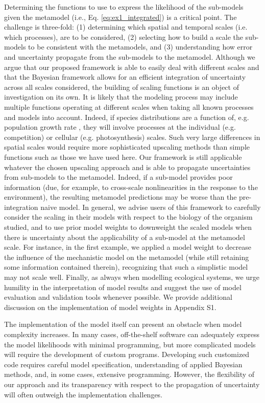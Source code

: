 \documentclass[11pt]{article}
\newcommand{\rev}[1]{{\color{RoyalBlue}#1}}
\begin{document}
Determining the functions to use to express the likelihood of the sub-models given the metamodel (i.e., Eq. \ref{eq:ex1_integrated}) is a critical point.
The challenge is three-fold: (1) determining which spatial and temporal scales (i.e. which processes), are to be considered, (2) selecting how to build a scale the sub-models to be consistent with the metamodels, and (3) understanding how error and uncertainty propagate from the sub-models to the metamodel. 
Although we argue that our proposed framework is able to easily deal with different scales and that the Bayesian framework allows for an efficient integration of uncertainty across all scales considered, the building of scaling functions is an object of investigation on its own. 
It is likely that the modeling process may include multiple functions operating at different scales when taking all known processes and models into account. 
Indeed, if species distributions are a function of, e.g. population growth rate \citep{Guisan2000}, they will involve processes at the individual (e.g. competition) or cellular (e.g. photosynthesis) scales. 
Such very large differences in spatial scales would require more sophisticated upscaling methods than simple functions such as those we have used here. 
Our framework is still applicable whatever the chosen upscaling approach and is able to propagate uncertainties from sub-models to the metamodel.
\rev{Indeed, if a sub-model provides poor information (due, for example, to cross-scale nonlinearities in the response to the environment), the resulting metamodel predictions may be worse than the pre-integration naive model.
In general, we advise users of this framework to carefully consider the scaling in their models with respect to the biology of the organism studied, and to use prior model weights to downweight the scaled models when there is uncertainty about the applicability of a sub-model at the metamodel scale.
For instance, in the first example, we applied a model weight to decrease the influence of the mechanistic model on the metamodel (while still retaining some information contained therein), recognizing that such a simplistic model may not scale well.
Finally, as always when modelling ecological systems, we urge humility in the interpretation of model results and suggest the use of model evaluation and validation tools whenever possible.
We provide additional discussion on the implementation of model weights in Appendix S1.}

The implementation of the model itself can present an obstacle when model complexity increases. 
In many cases, off-the-shelf software can adequately express the model likelihoods with minimal programming, but more complicated models will require the development of custom programs. 
Developing such customized code requires careful model specification, understanding of applied Bayesian methods, and, in some cases, extensive programming. 
However, the flexibility of our approach and its transparency with respect to the propagation of uncertainty will often outweigh the implementation challenges.
\end{document}
